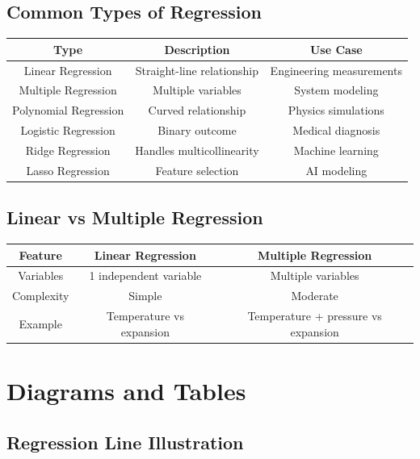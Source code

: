 \documentclass[12pt,a4paper]{article}
\begin{document}
	\subsection{Common Types of Regression}
	\begin{table}[h!]
		\centering
		\begin{tabular}{|c|c|c|}
			\hline
			\textbf{Type} & \textbf{Description} & \textbf{Use Case} \\
			\hline
			Linear Regression & Straight-line relationship & Engineering measurements \\
			Multiple Regression & Multiple variables & System modeling \\
			Polynomial Regression & Curved relationship & Physics simulations \\
			Logistic Regression & Binary outcome & Medical diagnosis \\
			Ridge Regression & Handles multicollinearity & Machine learning \\
			Lasso Regression & Feature selection & AI modeling \\
			\hline
		\end{tabular}
	\end{table}
	
	\subsection{Linear vs Multiple Regression}
	\begin{table}[h!]
		\centering
		\begin{tabular}{|c|c|c|}
			\hline
			\textbf{Feature} & \textbf{Linear Regression} & \textbf{Multiple Regression} \\
			\hline
			Variables & 1 independent variable & Multiple variables \\
			Complexity & Simple & Moderate \\
			Example & Temperature vs expansion & Temperature + pressure vs expansion \\
			\hline
		\end{tabular}
	\end{table}
	
	\section{Diagrams and Tables}
	
	\subsection{Regression Line Illustration}
	\begin{center}
	\end{center}
	
\end{document}
